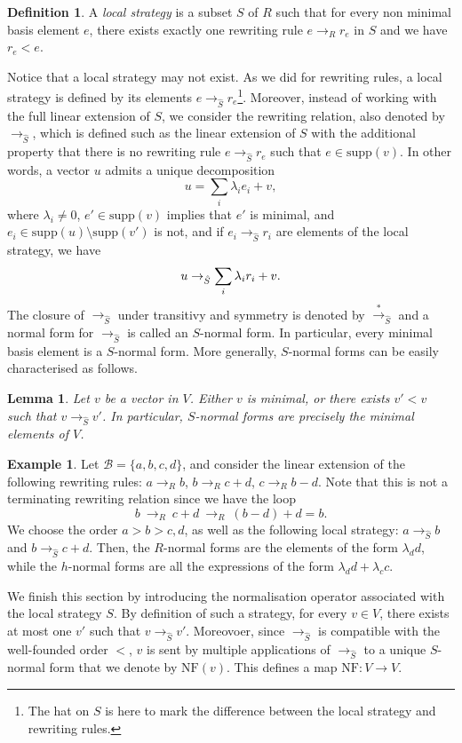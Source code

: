 \documentclass[10pt]{easychair}
\newtheorem{lemma}[theorem]{Lemma}
\theoremstyle{definition}
\newtheorem{definition}[theorem]{Definition}
\newtheorem{example}[theorem]{Example}
\newcommand\supp{\text{supp}}
\newcommand\basis{\mathscr{B}}
\newcommand\rewR{\to_R}
\newcommand\rewS{\to_{\hat{S}}}
\newcommand\transS{\overset{*}{\to}_{\hat{S}}}
\newcommand\NF{\text{NF}}
\begin{document}
\begin{definition}
  A \emph{local strategy} is a subset $S$ of $R$ such that for every non
  minimal basis element $e$, there exists exactly one rewriting rule
  $e\rewR r_e$ in $S$ and we have $r_e<e$. 
\end{definition}
\smallskip

Notice that a local strategy may not exist. As we did for rewriting
rules, a local strategy is defined by its elements $e\rewS r_e$\footnote{
  The hat on $S$ is here to mark the difference between the local
  strategy and rewriting rules.}. Moreover, instead of working with the
full linear extension of $S$, we consider the rewriting relation, also
denoted by $\rewS$, which is defined such as the linear extension of $S$
with the additional property that there is no rewriting rule $e\rewS r_e$
such that $e\in\supp(v)$. In other words, a vector $u$ admits a unique
decomposition
\[u=\sum_i\lambda_ie_i+v,\]
where $\lambda_i\neq 0$, $e'\in\supp(v)$ implies that $e'$ is minimal,
and $e_i\in\supp(u)\setminus\supp(v')$ is not, and if $e_i\rewS r_i$ are
elements of the local strategy, we have 
\[u\rewS\sum_i\lambda_ir_i+v.
  \smallskip\]
The closure of $\rewS$ under transitivy and symmetry is denoted by
$\transS$ and a normal form for $\rewS$ is called an $S$-normal form. In
particular, every minimal basis element is a $S$-normal form. More
generally, $S$-normal forms can be easily characterised as follows.
\medskip

\begin{lemma}\label{lem:h_normal_forms}
  Let $v$ be a vector in $V$. Either $v$ is minimal, or there exists
  $v'<v$ such that $v\rewS v'$. In particular, $S$-normal forms are
  precisely the minimal elements of $V$.
\end{lemma}
\smallskip

\begin{example}\label{ex:h_norma_form}
  Let $\basis=\{a,b,c,d\}$, and consider the linear extension of the
  following rewriting rules: $a\rewR b$, $b\rewR c+d$, $c\rewR b-d$. Note
  that this is not a terminating rewriting relation since we have the
  loop 
  \[b\ \rewR\ c+d\ \rewR\ (b-d)+d=b.\]
  We choose the order $a>b>c,d$, as well as the following local strategy:
  $a\rewS b$ and $b\rewS c+d$. Then, the $R$-normal forms are the
  elements of the form $\lambda_dd$, while the $h$-normal forms are all
  the expressions of the form $\lambda_dd+\lambda_cc$.
\end{example}
\smallskip

We finish this section by introducing the normalisation operator
associated with the local strategy $S$. By definition of such a
strategy, for every $v\in V$, there exists at most one $v'$ such that
$v\rewS v'$. Moreovoer, since $\rewS$ is compatible with the well-founded
order $<$, $v$ is sent by multiple applications of $\rewS$ to a unique
$S$-normal form that we denote by $\NF(v)$. This defines a map
$\NF:V\to V$.  
\end{document}
